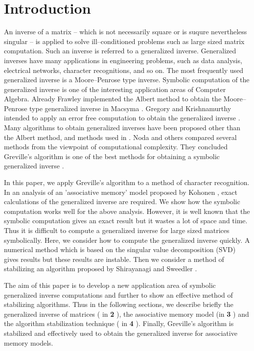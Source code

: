 \section{Introduction}
An inverse of a matrix -- which is not necessarily 
square or is suqure nevertheless singular -- 
is applied to solve ill--conditioned problems 
such as large sized matrix computation.  
Such an inverse is referred to a generalized inverse.  
Generalized inverses have many applications in engineering 
problems, such as data analysis, electrical networks, 
character recognitions, and so on.  The most frequently 
used generalized inverse is a Moore--Penrose type inverse. 
Symbolic computation of the generalized inverse is one 
of the interesting application areas of Computer Algebra.  
Already Frawley implemented the Albert method \cite{Al72} 
to obtain the Moore--Penrose type generalized inverse in 
Macsyma \cite{Fr85}.  Gregory and Krishnamurthy intended 
to apply an error free computation to obtain the 
generalized inverse \cite{Kr84}.  Many algorithms to 
obtain generalized inverses have been proposed other 
than the Albert method, and methods used in \cite{Kr84}.   
Noda and others \cite{No89,MS95} compared 
several methods from the viewpoint of computational 
complexity.  They concluded Greville's algorithm 
is one of the best methods for obtaining a symbolic 
generalized inverse \cite{Gr60}. \par
In this paper, we apply Greville's algorithm to 
a method of character recognition.  In an analysis of an
'associative memory' model proposed by Kohonen \cite{Ko72,Ko77},
exact calculations of the generalized inverse are required. We
show how the symbolic computation works well for the 
above analysis.  However, it is well known that the 
symbolic computation gives an exact result but it 
wastes a lot of space and time.  Thus it is difficult 
to compute a generalized inverse for large sized matrices 
symbolically.  Here, we consider how to compute the 
generalized inverse quickly.  A numerical method which 
is based on the singular value decomposition (SVD) 
gives results but these results are instable.  Then we consider 
a method of stabilizing an algorithm proposed by 
Shirayanagi and Sweedler \cite{SS95}.  \par
The aim of this paper is to develop a new application 
area of symbolic generalized inverse computations and 
further to show an effective method of 
stabilizing algorithms.  Thus in the following sections, 
we describe briefly the generalized inverse of 
matrices ( in {\bf 2} ), the associative memory model 
(in {\bf 3} ) and the algorithm stabilization technique 
( in {\bf 4} ).  Finally, Greville's algorithm is 
stabilized and effectively used to obtain the generalized 
inverse for associative memory models. 

